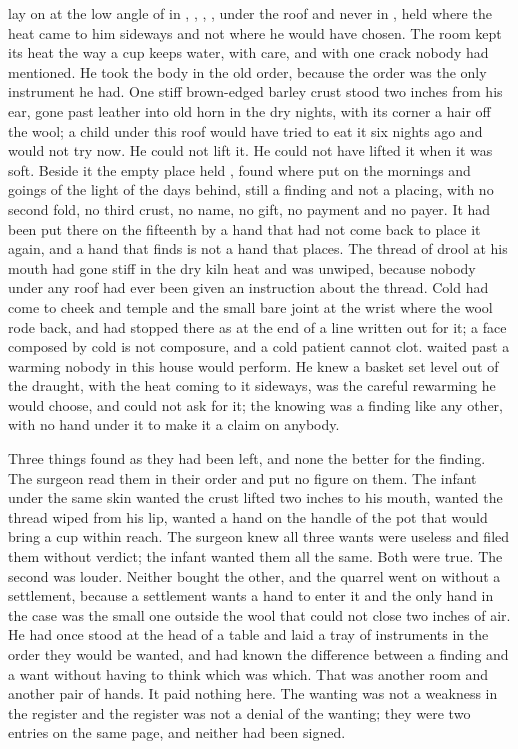 lay on  at the low angle of  in , , , , under the roof and never in , held where the heat came to him sideways and not where he would have chosen. The room kept its heat the way a cup keeps water, with care, and with one crack nobody had mentioned. He took the body in the old order, because the order was the only instrument he had. One stiff brown-edged barley crust stood two inches from his ear, gone past leather into old horn in the dry nights, with its corner a hair off the wool; a child under this roof would have tried to eat it six nights ago and would not try now. He could not lift it. He could not have lifted it when it was soft. Beside it the empty place held , found where put on the mornings and goings of the light of the days behind, still a finding and not a placing, with no second fold, no third crust, no name, no gift, no payment and no payer. It had been put there on the fifteenth by a hand that had not come back to place it again, and a hand that finds is not a hand that places. The thread of drool at his mouth had gone stiff in the dry kiln heat and was unwiped, because nobody under any roof had ever been given an instruction about the thread. Cold had come to cheek and temple and the small bare joint at the wrist where the wool rode back, and had stopped there as at the end of a line written out for it; a face composed by cold is not composure, and a cold patient cannot clot.  waited past a warming nobody in this house would perform. He knew a basket set level out of the draught, with the heat coming to it sideways, was the careful rewarming he would choose, and could not ask for it; the knowing was a finding like any other, with no hand under it to make it a claim on anybody.

Three things found as they had been left, and none the better for the finding. The surgeon read them in their order and put no figure on them. The infant under the same skin wanted the crust lifted two inches to his mouth, wanted the thread wiped from his lip, wanted a hand on the handle of the pot that would bring a cup within reach. The surgeon knew all three wants were useless and filed them without verdict; the infant wanted them all the same. Both were true. The second was louder. Neither bought the other, and the quarrel went on without a settlement, because a settlement wants a hand to enter it and the only hand in the case was the small one outside the wool that could not close two inches of air. He had once stood at the head of a table and laid a tray of instruments in the order they would be wanted, and had known the difference between a finding and a want without having to think which was which. That was another room and another pair of hands. It paid nothing here. The wanting was not a weakness in the register and the register was not a denial of the wanting; they were two entries on the same page, and neither had been signed.

